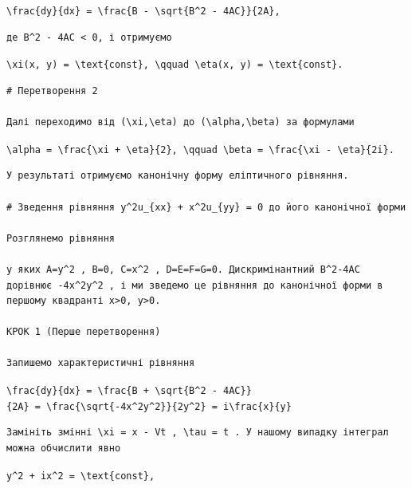 \documentclass[
  ukrainian,
]{article}
\begin{document}
\texttt{\textbackslash{}frac\{dy\}\{dx\}\ =\ \textbackslash{}frac\{B\ -\ \textbackslash{}sqrt\{B\^{}2\ -\ 4AC\}\}\{2A\},}

\begin{verbatim}
де B^2 - 4AC < 0, і отримуємо
\end{verbatim}

\texttt{\textbackslash{}xi(x,\ y)\ =\ \textbackslash{}text\{const\},\ \textbackslash{}qquad\ \textbackslash{}eta(x,\ y)\ =\ \textbackslash{}text\{const\}.}

\begin{verbatim}
# Перетворення 2

Далі переходимо від (\xi,\eta) до (\alpha,\beta) за формулами
\end{verbatim}

\texttt{\textbackslash{}alpha\ =\ \textbackslash{}frac\{\textbackslash{}xi\ +\ \textbackslash{}eta\}\{2\},\ \textbackslash{}qquad\ \textbackslash{}beta\ =\ \textbackslash{}frac\{\textbackslash{}xi\ -\ \textbackslash{}eta\}\{2i\}.}

\begin{verbatim}
У результаті отримуємо канонічну форму еліптичного рівняння.

# Зведення рівняння y^2u_{xx} + x^2u_{yy} = 0 до його канонічної форми

Розглянемо рівняння

у яких A=y^2 , B=0, C=x^2 , D=E=F=G=0. Дискримінантний B^2-4AC дорівнює -4x^2y^2 , і ми зведемо це рівняння до канонічної форми в першому квадранті x>0, y>0.

КРОК 1 (Перше перетворення)

Запишемо характеристичні рівняння
\end{verbatim}

\texttt{\textbackslash{}frac\{dy\}\{dx\}\ =\ \textbackslash{}frac\{B\ +\ \textbackslash{}sqrt\{B\^{}2\ -\ 4AC\}\}\{2A\}\ =\ \textbackslash{}frac\{\textbackslash{}sqrt\{-4x\^{}2y\^{}2\}\}\{2y\^{}2\}\ =\ i\textbackslash{}frac\{x\}\{y\}}

\begin{verbatim}
Замініть змінні \xi = x - Vt , \tau = t . У нашому випадку інтеграл можна обчислити явно
\end{verbatim}

\texttt{y\^{}2\ +\ ix\^{}2\ =\ \textbackslash{}text\{const\},}
\end{document}
